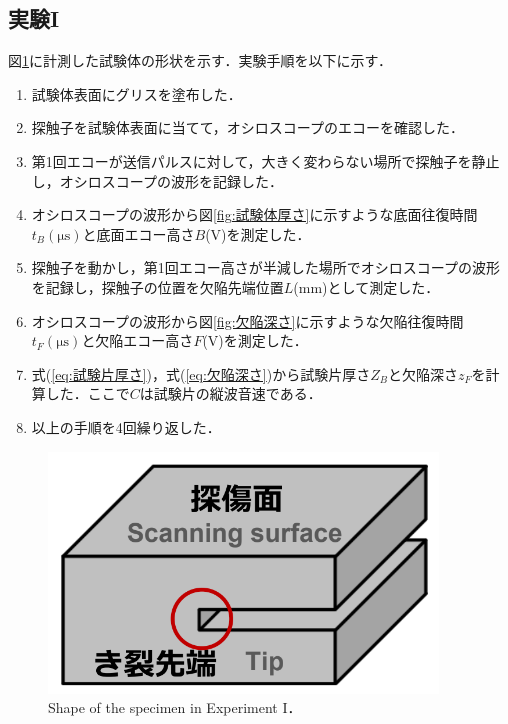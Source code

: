 \subsection{実験I}
図\ref{fig:実験I}に計測した試験体の形状を示す．実験手順を以下に示す．
\begin{enumerate}
    \item 試験体表面にグリスを塗布した．
    \item 探触子を試験体表面に当てて，オシロスコープのエコーを確認した．
    \item 第1回エコーが送信パルスに対して，大きく変わらない場所で探触子を静止し，オシロスコープの波形を記録した．
    \item オシロスコープの波形から図\ref{fig:試験体厚さ}に示すような底面往復時間$t_B(\mathrm{\mu s})$と底面エコー高さ$B$(V)を測定した．
    \item 探触子を動かし，第1回エコー高さが半減した場所でオシロスコープの波形を記録し，探触子の位置を欠陥先端位置$L$(mm)として測定した．
    \item オシロスコープの波形から図\ref{fig:欠陥深さ}に示すような欠陥往復時間$t_F(\mathrm{\mu s})$と欠陥エコー高さ$F$(V)を測定した．
    \item 式(\ref{eq:試験片厚さ})，式(\ref{eq:欠陥深さ})から試験片厚さ$Z_B$と欠陥深さ$z_F$を計算した．ここで$C$は試験片の縦波音速である．
    \item 以上の手順を4回繰り返した．
\end{enumerate}
\begin{figure}[htbp]
    \centering %
    \includegraphics[width=100truemm,clip]{fig/実験I.png}
    \caption{Shape of the specimen in Experiment I．}
    \label{fig:実験I}
\end{figure}
